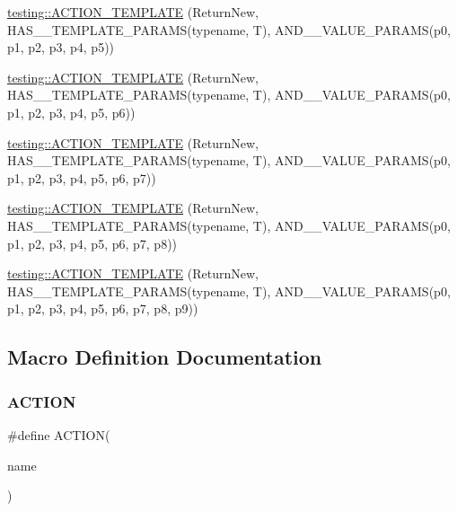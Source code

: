 \begin{DoxyCompactItemize}
\item 
\mbox{\hyperlink{namespacetesting_a2ef1b31693ee2be0bb93602b375fb9ce}{testing\+::\+A\+C\+T\+I\+O\+N\+\_\+\+T\+E\+M\+P\+L\+A\+TE}} (Return\+New, H\+A\+S\+\_\+\_\+\+T\+E\+M\+P\+L\+A\+T\+E\+\_\+\+P\+A\+R\+A\+MS(typename, T), A\+N\+D\+\_\+\_\+\+V\+A\+L\+U\+E\+\_\+\+P\+A\+R\+A\+MS(p0, p1, p2, p3, p4, p5))
\item 
\mbox{\hyperlink{namespacetesting_a7b4cfa09367e9938561eeca5a105d183}{testing\+::\+A\+C\+T\+I\+O\+N\+\_\+\+T\+E\+M\+P\+L\+A\+TE}} (Return\+New, H\+A\+S\+\_\+\_\+\+T\+E\+M\+P\+L\+A\+T\+E\+\_\+\+P\+A\+R\+A\+MS(typename, T), A\+N\+D\+\_\+\_\+\+V\+A\+L\+U\+E\+\_\+\+P\+A\+R\+A\+MS(p0, p1, p2, p3, p4, p5, p6))
\item 
\mbox{\hyperlink{namespacetesting_a76d58331453ee0a2eb75a5992e35197b}{testing\+::\+A\+C\+T\+I\+O\+N\+\_\+\+T\+E\+M\+P\+L\+A\+TE}} (Return\+New, H\+A\+S\+\_\+\_\+\+T\+E\+M\+P\+L\+A\+T\+E\+\_\+\+P\+A\+R\+A\+MS(typename, T), A\+N\+D\+\_\+\_\+\+V\+A\+L\+U\+E\+\_\+\+P\+A\+R\+A\+MS(p0, p1, p2, p3, p4, p5, p6, p7))
\item 
\mbox{\hyperlink{namespacetesting_adfb5791a941ec1f2a2f8067fd9ac7667}{testing\+::\+A\+C\+T\+I\+O\+N\+\_\+\+T\+E\+M\+P\+L\+A\+TE}} (Return\+New, H\+A\+S\+\_\+\_\+\+T\+E\+M\+P\+L\+A\+T\+E\+\_\+\+P\+A\+R\+A\+MS(typename, T), A\+N\+D\+\_\+\_\+\+V\+A\+L\+U\+E\+\_\+\+P\+A\+R\+A\+MS(p0, p1, p2, p3, p4, p5, p6, p7, p8))
\item 
\mbox{\hyperlink{namespacetesting_a3934a47f6125504c939a3573b7fc55c4}{testing\+::\+A\+C\+T\+I\+O\+N\+\_\+\+T\+E\+M\+P\+L\+A\+TE}} (Return\+New, H\+A\+S\+\_\+\_\+\+T\+E\+M\+P\+L\+A\+T\+E\+\_\+\+P\+A\+R\+A\+MS(typename, T), A\+N\+D\+\_\+\_\+\+V\+A\+L\+U\+E\+\_\+\+P\+A\+R\+A\+MS(p0, p1, p2, p3, p4, p5, p6, p7, p8, p9))
\end{DoxyCompactItemize}


\subsection{Macro Definition Documentation}
\mbox{\label{_obj__test_2lib_2googletest-master_2googlemock_2include_2gmock_2gmock-generated-actions_8h_a7af7137aa4871df4235881af377205fe}} 
\subsubsection{\texorpdfstring{ACTION}{ACTION}}
{\footnotesize\ttfamily \#define A\+C\+T\+I\+ON(\begin{DoxyParamCaption}\item[{}]{name }\end{DoxyParamCaption})}

